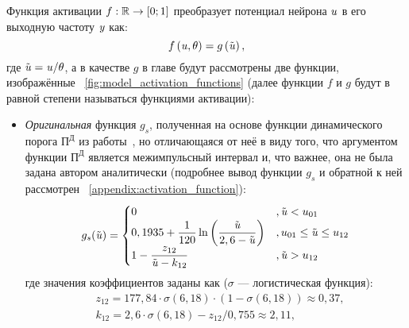 Функция активации $f: \mathbb{R} \to \left[0;1\right]$ преобразует потенциал нейрона $\mathit{u}$ в его выходную частоту $\mathit{y}$ как:
\begin{equation}
    \label{eq:activation_function}
    f\left( \mathit{u}, \theta \right) = g\left( \tilde{\mathit{u}} \right), 
\end{equation}
где $\tilde{\mathit{u}} = \mathit{u} / \theta$, а в качестве $g$ в главе будут рассмотрены две функции, изображённые \onfigure~\ref{fig:model_activation_functions} (далее функции $f$ и $g$ будут в равной степени называться функциями активации):


\begin{itemize}
	\item \textit{Оригинальная} функция $g_{s}$, полученная на основе функции динамического порога $\text{П}^\text{Д}$ из работы~\cite{EmelyanovYaroslavsky1990}, но отличающаяся от неё в виду того, что аргументом функции  $\text{П}^\text{Д}$ является межимпульсный интервал и, что важнее, она не была задана автором аналитически (подробнее вывод функции $g_{s}$ и обратной к ней рассмотрен \inappendix~\ref{appendix:activation_function}):
		\begin{equation}
            \label{eq:activation_function_original}
            g_{s}(\tilde{\mathit{u}}) = 
            \begin{cases}
                0                                                                                               &, \tilde{\mathit{u}} < u_{01} \\
                0,1935 + \dfrac{1}{120} \ln\left( \dfrac{\tilde{\mathit{u}}}{2,6 - \tilde{\mathit{u}}} \right)  &, u_{01} \le \tilde{\mathit{u}} \le u_{12} \\
                1 - \dfrac{z_{12}}{\tilde{\mathit{u}} - k_{12}}                                                   &, \tilde{\mathit{u}} > u_{12} \\
            \end{cases}
		\end{equation}
        где значения коэффициентов заданы как ($\sigma$ --- логистическая функция):
        \begin{align*}
            &z_{12} = 177,84 \cdot \sigma\left(6,18\right) \cdot \left(1 - \sigma\left(6,18\right)\right) \approx 0,37, \\
            &k_{12} = 2,6 \cdot \sigma\left(6,18\right) - z_{12} / 0,755 \approx 2,11, \\

\end{align*}
\end{itemize}

